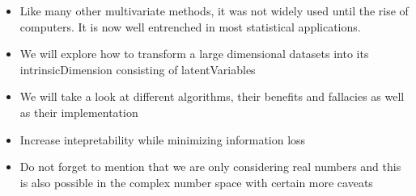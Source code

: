\begin{itemize}
	\item Like many other multivariate methods, it was not widely used until the rise of computers. 
	It is now well entrenched in most statistical applications. \cite{Jolliffe2002book}
	\item We will explore how to transform a large dimensional datasets into its \gls{intrinsicDimension} consisting of \glspl{latentVariable}
	\item We will take a look at different algorithms, their benefits and fallacies as well as their implementation
	\item Increase intepretability while minimizing information loss \cite{jolliffe2016principal}
	\item Do not forget to mention that we are only considering real numbers and this is also possible in the complex number space with certain more caveats
\end{itemize}
